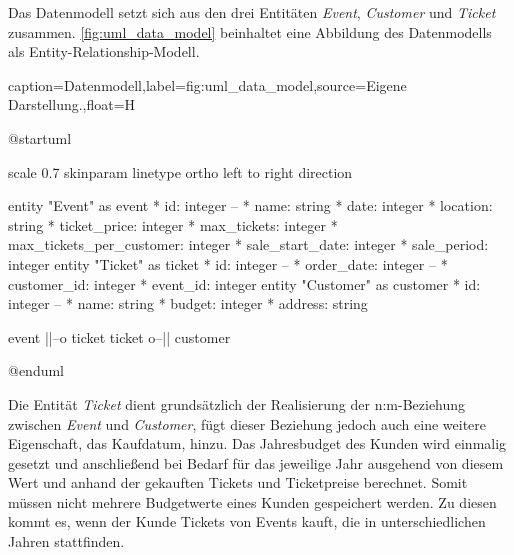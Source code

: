 Das Datenmodell setzt sich aus den drei Entitäten \textit{Event}, \textit{Customer} und \textit{Ticket} zusammen.
\autoref{fig:uml_data_model} beinhaltet eine Abbildung des Datenmodells als Entity-Relationship-Modell.

\begin{dhbwfigure}{caption=Datenmodell,label=fig:uml_data_model,source={Eigene Darstellung.},float=H}
    \begin{plantuml}
        @startuml

        scale 0.7
        skinparam linetype ortho
        left to right direction

        entity "Event" as event {
            * id: integer
            --
            * name: string
            * date: integer
            * location: string
            * ticket_price: integer
            * max_tickets: integer
            * max_tickets_per_customer: integer
            * sale_start_date: integer
            * sale_period: integer
        }   
        entity "Ticket" as ticket {
            * id: integer
            --
            * order_date: integer
            --
            * customer_id: integer
            * event_id: integer
        }
        entity "Customer" as customer {
            * id: integer
            --
            * name: string
            * budget: integer
            * address: string
        }

        event ||--o{ ticket
        ticket }o--|| customer

        @enduml
    \end{plantuml}
\end{dhbwfigure}\unskip

Die Entität \textit{Ticket} dient grundsätzlich der Realisierung der n:m-Beziehung zwischen \textit{Event} und \textit{Customer}, fügt dieser Beziehung jedoch auch eine weitere Eigenschaft, das Kaufdatum, hinzu.
Das Jahresbudget des Kunden wird einmalig gesetzt und anschließend bei Bedarf für das jeweilige Jahr ausgehend von diesem Wert und anhand der gekauften Tickets und Ticketpreise berechnet.
Somit müssen nicht mehrere Budgetwerte eines Kunden gespeichert werden. 
Zu diesen kommt es, wenn der Kunde Tickets von Events kauft, die in unterschiedlichen Jahren stattfinden.
